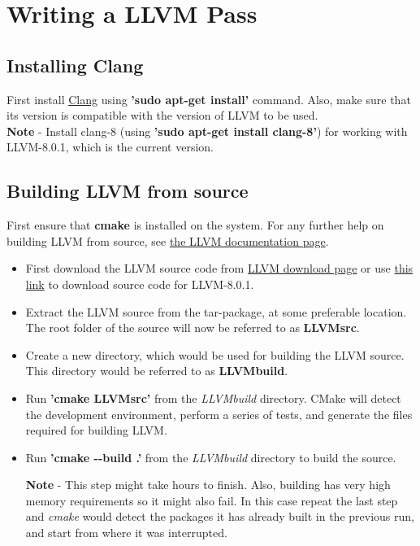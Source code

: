 \chapter{Writing a LLVM Pass}
\label{chap:chapter6}

\section{Installing Clang}
\label{InstallClang}
First install \href{https://clang.llvm.org/}{Clang} using 
\textbf{'sudo apt-get install'} command. Also, make sure that its 
version is compatible with the version of LLVM to be used. \\
\textbf{Note} - Install clang-8 (using \textbf{'sudo apt-get install 
clang-8'}) for working with LLVM-8.0.1, which is the current version.


\section{Building LLVM from source}
\label{BuildingLLVMFromSource}

First ensure that \textbf{cmake} is installed on the system. For any 
further help on building LLVM from source, see 
\href{https://llvm.org/docs/CMake.html}{the LLVM documentation page}.

\begin{itemize}
    \item First download the LLVM source code from 
    \href{http://releases.llvm.org/download.html}{LLVM download page} 
    or use \href{https://github.com/llvm/llvm-project/releases/download/llvmorg-8.0.1/llvm-8.0.1.src.tar.xz}{this link}
    to download source code for LLVM-8.0.1. 
    \item Extract the LLVM source from the tar-package, at some 
    preferable location. The root folder of the source will now be 
    referred to as \textbf{LLVMsrc}.
    \item Create a new directory, which would be used for building 
    the LLVM source. This directory would be referred to as 
    \textbf{LLVMbuild}.
    \item Run \textbf{'cmake LLVMsrc'} from the \textit{LLVMbuild} 
    directory. CMake will detect the development environment, perform 
    a series of tests, and generate the files required for building 
    LLVM. 
    \item Run \textbf{'cmake -{}-build .'} from the \textit{LLVMbuild}
    directory to build the source.

    \textbf{Note} - This step might take hours to finish. Also, 
    building has very high memory requirements so it might also fail. 
    In this case repeat the last step and \textit{cmake} would detect 
    the packages it has already built in the previous run, and start 
    from where it was interrupted.
\end{itemize}
        
